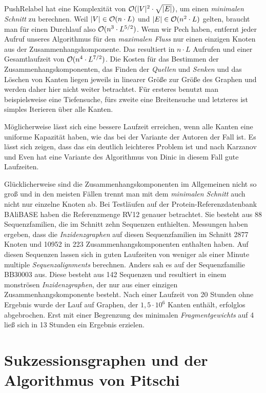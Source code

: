 \textrm{PushRelabel} hat eine Komplexität von $\mathcal{O}(|V|^2\cdot \sqrt{|E|})$, um einen \emph{minimalen Schnitt} zu berechnen. Weil $|V| \in \mathcal{O}(n\cdot L)$ und $|E| \in \mathcal{O}(n^2\cdot L)$ gelten, braucht man für einen Durchlauf also $\mathcal{O}(n^3\cdot L^{5/2})$. Wenn wir Pech haben, entfernt jeder Aufruf unseres Algorithmus für den \emph{maximalen Fluss} nur einen einzigen Knoten aus der Zusammenhangskomponente. Das resultiert in $n\cdot L$ Aufrufen und einer Gesamtlaufzeit von $\mathcal{O}(n^4\cdot L^{7/2})$. Die Kosten für das Bestimmen der Zusammenhangskomponenten, das Finden der \emph{Quellen} und \emph{Senken} und das Löschen von Kanten liegen jeweils in linearer Größe zur Größe des Graphen und werden daher hier nicht weiter betrachtet. Für ersteres benutzt man beispielsweise eine Tiefensuche, fürs zweite eine Breitensuche und letzteres ist simples Iterieren über alle Kanten.

Möglicherweise lässt sich eine bessere Laufzeit erreichen, wenn alle Kanten eine uniforme Kapazität haben, wie das bei der Variante der Autoren der Fall ist. Es lässt sich zeigen, dass das ein deutlich leichteres Problem ist \citep{gt14} und nach Karzanov und Even hat eine Variante des Algorithmus von Dinic in diesem Fall gute Laufzeiten.

Glücklicherweise sind die Zusammenhangskomponenten im Allgemeinen nicht so groß und in den meisten Fällen trennt man mit dem \emph{minimalen Schnitt} auch nicht nur einzelne Knoten ab. Bei Testläufen auf der Protein-Referenzdatenbank BAliBASE haben \cite{cpm10} die Referenzmenge RV12 genauer betrachtet. Sie besteht aus 88 Sequenzfamilien, die im Schnitt zehn Sequenzen enthielten. Messungen haben ergeben, dass die \emph{Inzidenzgraphen} auf diesen Sequenzfamilien im Schnitt 2877 Knoten und 10952 in 223 Zusammenhangskomponenten enthalten haben. Auf diesen Sequenzen lassen sich in guten Laufzeiten von weniger als einer Minute multiple \emph{Sequenzalignments} berechnen. Anders sah es auf der Sequenzfamilie BB30003 aus. Diese besteht aus 142 Sequenzen und resultiert in einem monströsen \emph{Inzidenzgraphen}, der nur aus einer einzigen Zusammenhangskomponente besteht. Nach einer Laufzeit von 20 Stunden ohne Ergebnis wurde der Lauf auf Graphen, der $1,5\cdot 10^6$ Kanten enthält, erfolglos abgebrochen. Erst mit einer Begrenzung des minimalen \emph{Fragmentgewichts} auf 4 ließ sich in 13 Stunden ein Ergebnis erzielen. 

\section{Sukzessionsgraphen und der Algorithmus von Pitschi}


